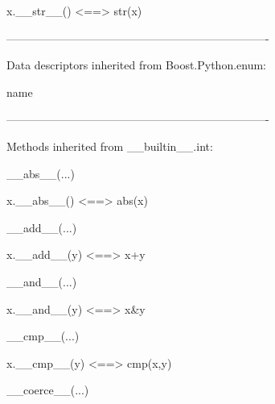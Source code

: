 \documentclass[letterpaper,10pt,english]{sphinxmanual}
\begin{document}
\begin{description}
\begin{description}
\begin{DUlineblock}{0em}
\begin{DUlineblock}{\DUlineblockindent}
\item[] x.\_\_str\_\_() \textless{}==\textgreater{} str(x)
\item[] 
\end{DUlineblock}
\item[] ----------------------------------------------------------------------
\item[] Data descriptors inherited from Boost.Python.enum:
\item[] 
\item[] name
\item[] 
\item[] ----------------------------------------------------------------------
\item[] Methods inherited from \_\_builtin\_\_.int:
\item[] 
\item[] \_\_abs\_\_(...)
\item[]
\begin{DUlineblock}{\DUlineblockindent}
\item[] x.\_\_abs\_\_() \textless{}==\textgreater{} abs(x)
\item[] 
\end{DUlineblock}
\item[] \_\_add\_\_(...)
\item[]
\begin{DUlineblock}{\DUlineblockindent}
\item[] x.\_\_add\_\_(y) \textless{}==\textgreater{} x+y
\item[] 
\end{DUlineblock}
\item[] \_\_and\_\_(...)
\item[]
\begin{DUlineblock}{\DUlineblockindent}
\item[] x.\_\_and\_\_(y) \textless{}==\textgreater{} x\&y
\item[] 
\end{DUlineblock}
\item[] \_\_cmp\_\_(...)
\item[]
\begin{DUlineblock}{\DUlineblockindent}
\item[] x.\_\_cmp\_\_(y) \textless{}==\textgreater{} cmp(x,y)
\item[] 
\end{DUlineblock}
\item[] \_\_coerce\_\_(...)
\item[]

\end{DUlineblock}
\end{description}
\end{description}
\end{document}
